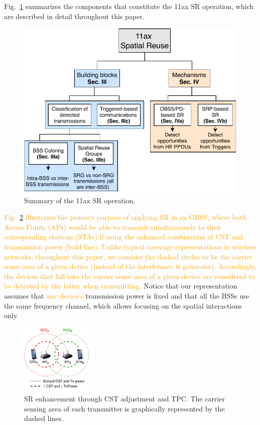 \documentclass{ieeeaccess}
\begin{document}
Fig.~\ref{fig:sr_summary} summarizes the components that constitute the 11ax SR operation, which are described in detail throughout this paper.

\begin{figure}[ht!]
	\centering
	\includegraphics[width=\columnwidth]{sr_summary}
	\caption{Summary of the 11ax SR operation.}
	\label{fig:sr_summary}
\end{figure}

\textcolor{orange}{Fig.~\ref{fig:spatial_reuse_11ax} illustrates the primary purpose of applying SR in an OBSS, where both Access Points (APs) would be able to transmit simultaneously to their corresponding stations (STAs) if using the enhanced combination of CST and transmission power (bold line). Unlike typical coverage representations in wireless networks, throughout this paper, we consider the dashed circles to be the carrier sense area of a given device (instead of the interference it generates). Accordingly, the devices that fall into the carrier sense area of a given device are considered to be detected by the latter when transmitting.} Notice that our representation assumes that \textcolor{orange}{any device's} transmission power is fixed and that all the BSSs use the same frequency channel, which allows focusing on the spatial interactions only. 
\begin{figure}[ht!]
	\centering
	\includegraphics[width=0.33\textwidth]{fig_1.pdf}
	\caption{SR enhancement through CST adjustment and TPC. The carrier sensing area of each transmitter is graphically represented by the dashed lines.}
	\label{fig:spatial_reuse_11ax}
\end{figure}
\end{document}
